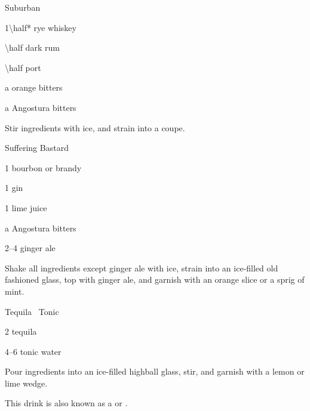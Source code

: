 \begin{Cocktail}{Suburban}
	\begin{Ingredients}
	\item \SI{1\half*}{\oz} rye whiskey
	\item \SI{\half}{\oz} dark rum
	\item \SI{\half}{\oz} port
	\item a \si{\dash} orange bitters
	\item a \si{\dash} Angostura bitters
	\end{Ingredients}
	
	\begin{Instructions}
	Stir ingredients with ice, and strain into a coupe.
	\end{Instructions}
\end{Cocktail}

\begin{Cocktail}{Suffering Bastard}
	\begin{Ingredients}
	\item \SI{1}{\oz} bourbon or brandy
	\item \SI{1}{\oz} gin
	\item \SI{1}{\oz} lime juice
	\item a \si{\dash} Angostura bitters
	\item \SIrange{2}{4}{\oz} ginger ale
	\end{Ingredients}
	
	\begin{Instructions}
	Shake all ingredients except ginger ale with ice, strain into an ice-filled old fashioned glass, top with ginger ale, and garnish with an orange slice or a sprig of mint.
	\end{Instructions}
\end{Cocktail}

\begin{Cocktail}{Tequila \And\ Tonic}
	\begin{Ingredients}
	\item \SI{2}{\oz} tequila
	\item \SIrange{4}{6}{\oz} tonic water
	\end{Ingredients}
	
	\begin{Instructions}
	Pour ingredients into an ice-filled highball glass, stir, and garnish with a lemon or lime wedge.
	
	This drink is also known as a  or \InlineCocktail*{Teqtonic}.
	\end{Instructions}
\end{Cocktail}

